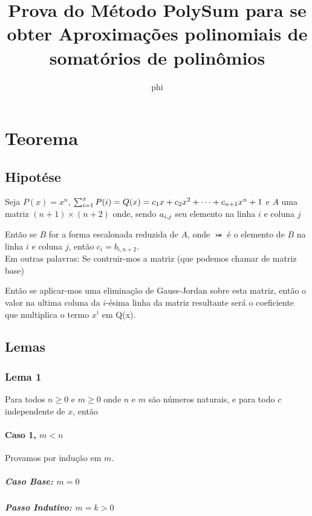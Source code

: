 \documentclass[a4paper, 10pt]{article}
\title{Prova do M\'etodo PolySum para se obter Aproxima\c{c}\~oes polinomiais de somat\'orios de polin\^omios}
\author{phi}
\begin{document}
\allowdisplaybreaks
\maketitle

\section{Teorema}
\subsection{Hipot\'ese}

Seja $P(x) = x^n$, $\sum_{i=1}^{x}P(i) = Q(x) = c_1x + c_2x^2 + \cdots + c_{n+1}x^n+1$ e $A$ uma matriz $(n+1) \times (n+2)$ onde, sendo $a_{i,j}$ seu elemento na linha $i$ e coluna $j$

\aijDef

Ent\~ao se $B$ for a forma escalonada reduzida de $A$, onde $\bij$ \'e o elemento de $B$ na linha $i$ e coluna $j$, ent\~ao $c_i = b_{i,n+2}$.\\

Em outras palavras: Se contruir-mos a matriz (que podemos chamar de matriz base)

\AMatrix

Ent\~ao se aplicar-mos uma elimina\c{c}\~ao de Gauss-Jordan sobre esta matriz, ent\~ao o valor na ultima coluna da $i$-\'esima linha da matriz resultante ser\'a o coeficiente que multiplica o termo $x^i$ em Q(x).

\subsection{Lemas}
\subsubsection{Lema 1}

Para todos $n \geq 0$ e $m \geq 0$ onde $n$ e $m$ s\~ao n\'umeros naturais, e para todo $c$ independente de $x$, ent\~ao
\lemmaOne

\paragraph{Caso 1, $m < n$}

Provamos por indu\c{c}\~ao em $m$.

\subparagraph{Caso Base: $m = 0$}

\lemmaOneCaseOneBase

\subparagraph{Passo Indutivo: $m = k > 0$}
\end{document}
